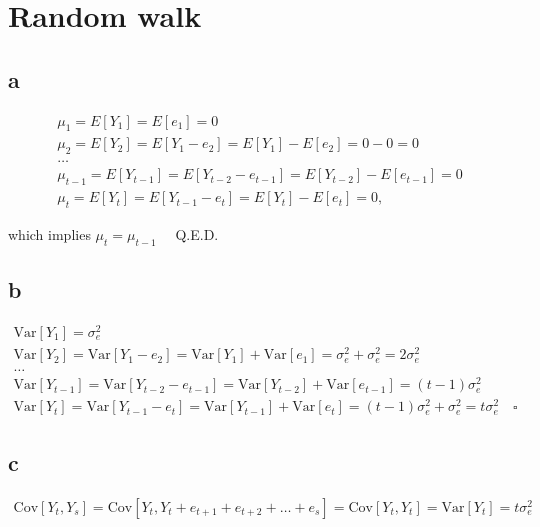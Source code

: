 \documentclass[]{book}
\theoremstyle{definition}
\theoremstyle{definition}
\theoremstyle{remark}
\begin{document}
\section{Random walk}\label{random-walk}

\subsection*{a}\label{a-14}

\begin{gather*}
  \mu_1 = E[Y_1] = E[e_1] = 0\\
  \mu_2 = E[Y_2] = E[Y_1 - e_2] = E[Y_1] - E[e_2] = 0 - 0 = 0\\
  \dots\\
  \mu_{t-1} = E[Y_{t-1}] = E[Y_{t-2} - e_{t-1}] = E[Y_{t-2}] - E[e_{t-1}] = 0 \\
  \mu_t = E[Y_t] = E[Y_{t-1} - e_t] = E[Y_t] - E[e_t] = 0,
\end{gather*}

which implies \(\mu_t = \mu_{t-1}\quad\) Q.E.D.

\subsection*{b}\label{b-14}

\begin{gather*}
  \text{Var}[Y_1] = \sigma_e^2\\
  \text{Var}[Y_2] = \text{Var}[Y_1 - e_2] = \text{Var}[Y_1] + \text{Var}[e_1] = \sigma_e^2 +  \sigma_e^2 = 2\sigma_e^2\\
  \dots\\
  \text{Var}[Y_{t-1}] = \text{Var}[Y_{t-2} - e_{t-1}] = \text{Var}[Y_{t-2}] + \text{Var}[e_{t-1}]  = (t-1)\sigma_e^2\\
  \text{Var}[Y_t] = \text{Var}[Y_{t-1} - e_t] = \text{Var}[Y_{t-1}] + \text{Var}[e_t]  = (t-1)\sigma_e^2 + \sigma_e^2 = t\sigma_e^2 \quad \square
\end{gather*}

\subsection*{c}\label{c-8}

\begin{gather*}
  \text{Cov}[Y_t, Y_s] = \text{Cov}[Y_t, Y_t+e_{t+1}+e_{t+2}+ \dots + e_s] = \text{Cov}[Y_t, Y_t] = \text{Var}[Y_t] = t\sigma_e^2
\end{gather*}
\end{document}
